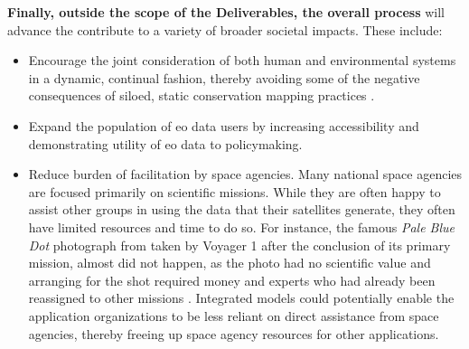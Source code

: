 \documentclass[notitlepage]{article}
\begin{document}
\textbf{Finally, outside the scope of the Deliverables, the overall process} will advance the contribute to a variety of broader societal impacts. These include:
\begin{itemize}
	\item Encourage the joint consideration of both human and environmental systems in a dynamic, continual fashion, thereby avoiding some of the negative consequences of siloed, static conservation mapping practices \cite{harrisRethinkingMapsMorethanhuman2011}. 
	\item Expand the population of \ac{eo} data users by increasing accessibility and demonstrating utility of \ac{eo} data to policymaking.
	\item Reduce burden of facilitation by space agencies. Many national space agencies are focused primarily on scientific missions. While they are often happy to assist other groups in using the data that their satellites generate, they often have limited resources and time to do so. For instance, the famous \textit{Pale Blue Dot} photograph from taken by Voyager 1 after the conclusion of its primary mission, almost did not happen, as the photo had no scientific value and arranging for the shot required money and experts who had already been reassigned to other missions \cite{greenfieldboycePaleBlueDot2010}. Integrated models could potentially enable the application organizations to be less reliant on direct assistance from space agencies, thereby freeing up space agency resources for other applications.
\end{itemize}




\newpage


\small{
}
\end{document}
